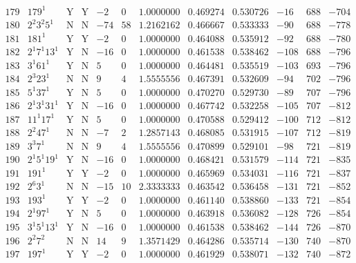 \documentclass[11pt,reqno,a4letter]{article}
\numberwithin{figure}{section}
\numberwithin{table}{section}
\theoremstyle{plain}
\numberwithin{theorem}{section}
\theoremstyle{definition}
\begin{document}
\begin{table}[ht]
\begin{equation*}
{\begin{array}{cc|cc|ccc|cc|ccc}
 179 & 179^1 & \text{Y} & \text{Y} & -2 & 0 & 1.0000000 & 0.469274 & 0.530726 & -16 & 688 & -704 \\
 180 & 2^2 3^2 5^1 & \text{N} & \text{N} & -74 & 58 & 1.2162162 & 0.466667 & 0.533333 & -90 & 688 & -778 \\
 181 & 181^1 & \text{Y} & \text{Y} & -2 & 0 & 1.0000000 & 0.464088 & 0.535912 & -92 & 688 & -780 \\
 182 & 2^1 7^1 13^1 & \text{Y} & \text{N} & -16 & 0 & 1.0000000 & 0.461538 & 0.538462 & -108 & 688 & -796 \\
 183 & 3^1 61^1 & \text{Y} & \text{N} & 5 & 0 & 1.0000000 & 0.464481 & 0.535519 & -103 & 693 & -796 \\
 184 & 2^3 23^1 & \text{N} & \text{N} & 9 & 4 & 1.5555556 & 0.467391 & 0.532609 & -94 & 702 & -796 \\
 185 & 5^1 37^1 & \text{Y} & \text{N} & 5 & 0 & 1.0000000 & 0.470270 & 0.529730 & -89 & 707 & -796 \\
 186 & 2^1 3^1 31^1 & \text{Y} & \text{N} & -16 & 0 & 1.0000000 & 0.467742 & 0.532258 & -105 & 707 & -812 \\
 187 & 11^1 17^1 & \text{Y} & \text{N} & 5 & 0 & 1.0000000 & 0.470588 & 0.529412 & -100 & 712 & -812 \\
 188 & 2^2 47^1 & \text{N} & \text{N} & -7 & 2 & 1.2857143 & 0.468085 & 0.531915 & -107 & 712 & -819 \\
 189 & 3^3 7^1 & \text{N} & \text{N} & 9 & 4 & 1.5555556 & 0.470899 & 0.529101 & -98 & 721 & -819 \\
 190 & 2^1 5^1 19^1 & \text{Y} & \text{N} & -16 & 0 & 1.0000000 & 0.468421 & 0.531579 & -114 & 721 & -835 \\
 191 & 191^1 & \text{Y} & \text{Y} & -2 & 0 & 1.0000000 & 0.465969 & 0.534031 & -116 & 721 & -837 \\
 192 & 2^6 3^1 & \text{N} & \text{N} & -15 & 10 & 2.3333333 & 0.463542 & 0.536458 & -131 & 721 & -852 \\
 193 & 193^1 & \text{Y} & \text{Y} & -2 & 0 & 1.0000000 & 0.461140 & 0.538860 & -133 & 721 & -854 \\
 194 & 2^1 97^1 & \text{Y} & \text{N} & 5 & 0 & 1.0000000 & 0.463918 & 0.536082 & -128 & 726 & -854 \\
 195 & 3^1 5^1 13^1 & \text{Y} & \text{N} & -16 & 0 & 1.0000000 & 0.461538 & 0.538462 & -144 & 726 & -870 \\
 196 & 2^2 7^2 & \text{N} & \text{N} & 14 & 9 & 1.3571429 & 0.464286 & 0.535714 & -130 & 740 & -870 \\
 197 & 197^1 & \text{Y} & \text{Y} & -2 & 0 & 1.0000000 & 0.461929 & 0.538071 & -132 & 740 & -872 \\

\end{array}}
\end{equation*}
\end{table}
\end{document}

